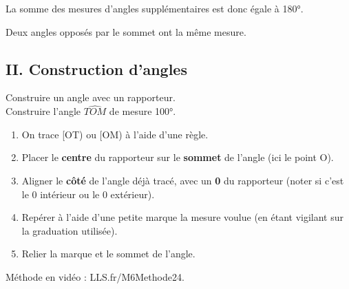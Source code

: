 \begin{Remarque}
\leavevmode\vspace{-\baselineskip}
La somme des mesures d'angles supplémentaires est donc égale à 180°.
\end{Remarque}
\vspace{0.8cm}

\begin{Propriété}[c]
Deux angles opposés par le sommet ont la même mesure.
\end{Propriété}


\subsection*{II. Construction d'angles}

\begin{Méthode} Construire un angle avec un rapporteur. \\
Construire l'angle $\widehat{TOM}$ de mesure 100°.\\
\begin{minipage}[t]{0.6\textwidth}
\vspace{0pt}
\begin{enumerate}[label=\textcolor{Couleur7}{\textbf{\arabic*.}}, leftmargin=*, itemsep=4pt]
    \item On trace [OT) ou [OM) à l'aide d'une règle.
    \item Placer le \textbf{centre} du rapporteur sur le \textbf{sommet} de l'angle (ici le point O).
    \item Aligner le \textbf{côté} de l'angle déjà tracé, avec un \textbf{0} du rapporteur (noter si c'est le 0 intérieur ou le 0 extérieur).
    \item Repérer à l'aide d'une petite marque la mesure voulue (en étant vigilant sur la graduation utilisée).
    \item Relier la marque et le sommet de l'angle.
\end{enumerate}
\end{minipage}\hfill
\begin{minipage}[t]{0.4\textwidth}



\end{minipage}

\end{Méthode}

\begin{Remarque}
Méthode en vidéo : LLS.fr/M6Methode24.
\end{Remarque}

